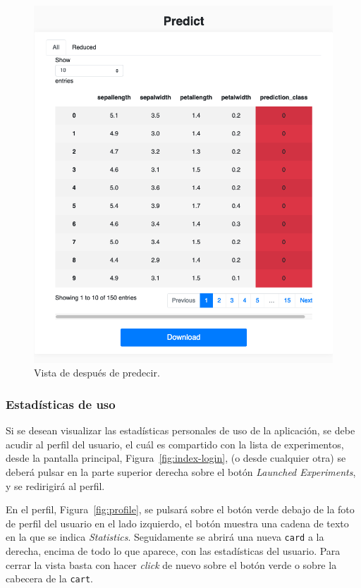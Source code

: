 \begin{figure}
\centering
\includegraphics[scale=0.4]{../img/anexos/manual-usuario/UBUMLaaS/post-predict}
\caption{Vista de después de predecir.}\label{fig:post-predict}
\end{figure}

\FloatBarrier
\subsubsection{Estadísticas de uso}
Si se desean visualizar las estadísticas personales de uso de la aplicación, se debe acudir al perfil del usuario, el cuál es compartido con la lista de experimentos, desde la pantalla principal, Figura~\ref{fig:index-login}, (o desde cualquier otra) se deberá pulsar en la parte superior derecha sobre el botón \textit{Launched Experiments}, y se redirigirá al perfil. 

En el perfil, Figura~\ref{fig:profile}, se pulsará sobre el botón verde debajo de la foto de perfil del usuario en el lado izquierdo, el botón muestra una cadena de texto en la que se indica \textit{Statistics}. Seguidamente se abrirá una nueva \texttt{card} a la derecha, encima de todo lo que aparece, con las estadísticas del usuario. Para cerrar la vista basta con hacer \textit{click} de nuevo sobre el botón verde o sobre la cabecera de la \texttt{cart}. 

